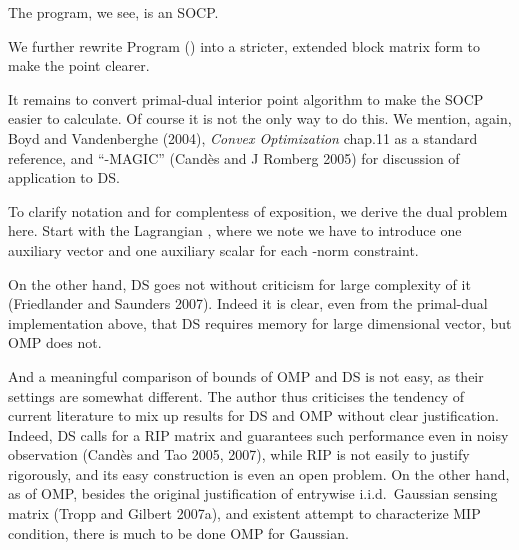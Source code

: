 The program, we see, is an SOCP.

We further rewrite Program () into a stricter, extended block matrix form to make the point clearer.

\color[red]{(To be done)}

\startsection [title={Primal-Dual Interior Point Algorithm}]

It remains to convert primal-dual interior point algorithm to make the SOCP easier to calculate.
Of course it is not the only way to do this.
We mention, again, Boyd and Vandenberghe (2004), {\it Convex Optimization} chap.11 as a standard reference, and ``-MAGIC'' (Cand\`es and J Romberg 2005) for discussion of application to DS.

To clarify notation and for complentess of exposition, we derive the dual problem here.
Start with the Lagrangian , where we note we have to introduce one auxiliary vector and one auxiliary scalar for each -norm constraint.

%
%

\startsection [title={Discussion}]


On the other hand, DS goes not without criticism for large complexity of it (Friedlander and Saunders 2007).
Indeed it is clear, even from the primal-dual implementation above, that DS requires memory for large dimensional vector, but OMP does not.

And a meaningful comparison of bounds of OMP and DS is not easy, as their settings are somewhat different.
The author thus criticises the tendency of current literature to mix up results for DS and OMP without clear justification.
Indeed, DS calls for a RIP matrix and guarantees such performance even in noisy observation (Cand\`es and Tao 2005, 2007), while RIP is not easily to justify rigorously, and its easy construction is even an open problem.
On the other hand, as of OMP, besides the original justification of entrywise i.i.d.\ Gaussian sensing matrix (Tropp and Gilbert 2007a), and existent attempt to characterize MIP condition, there is much to be done OMP for Gaussian.

\stopchapter
